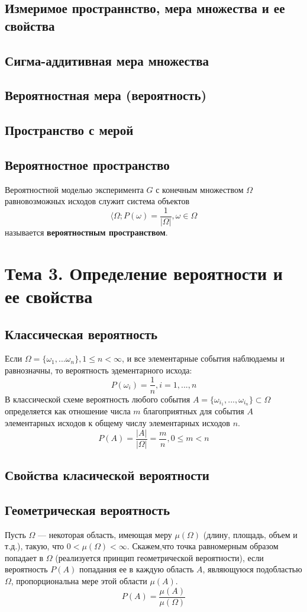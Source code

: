 \documentclass[12pt]{article}
\begin{document}
\subsection{Измеримое пространнство, мера множества и ее свойства}
\subsection{Сигма-аддитивная мера множества}
\subsection{Вероятностная мера (вероятность)}
\subsection{Пространство с мерой}
\subsection{Вероятностное пространство}
Вероятностной моделью эксперимента $G$ с конечным множеством $\Omega$
равновозможных исходов служит система объектов
\[\langle \Omega; P(\omega) = \frac{1}{|\Omega|}, \omega \in \Omega\]
называется \textbf{вероятностным пространством}.

\section{Тема 3. Определение вероятности и ее свойства}

\subsection{Классическая вероятность}
Если $\Omega = \{\omega_1, ... \omega_n\}, 1 \leq n < \infty$, и все элементарные события наблюдаемы и равнозначны,
то вероятность эдементарного исхода:
\[P(\omega_i) = \frac{1}{n}, i = 1, ..., n\]
В классической схеме вероятность любого события $A = \{\omega_{i_1}, ..., \omega_{i_n}\} \subset \Omega$ определяется
как отношение числа $m$ благоприятных для события $A$ элементарных исходов
к общему числу элементарных исходов $n$. \\
\[P(A) = \frac{|A|}{|\Omega|} = \frac{m}{n}, 0 \leq m < n\]

\subsection{Свойства класической вероятности}

\subsection{Геометрическая вероятность}
Пусть $\Omega$ --- некоторая область, имеющая меру $\mu(\Omega)$ (длину, площадь, объем и т.д.), такую,
что $0 < \mu(\Omega) < \infty$.
Скажем,что точка равномерным образом попадает в $\Omega$ (реализуется принцип геометрической вероятности),
если вероятность $P(A)$ попадания ее в каждую область $A$, являющуюся подобластью $\Omega$,
пропорциональна мере этой области $\mu(A)$. \\
\[P(A) = \frac{\mu(A)}{\mu(\Omega)}\]
\end{document}
